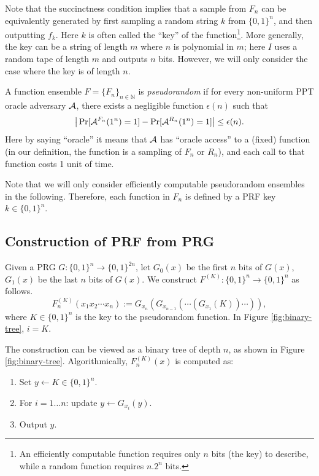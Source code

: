 Note that the succinctness condition implies that a sample from $F_n$ can be equivalently generated by first sampling a random string $k$ from $\{0, 1\}^n$, and then outputting $f_k$. Here $k$ is often called the ``key'' of the function\footnote{An efficiently computable function requires only $n$ bits (the key) to describe, while a random function requires $n.2^n$ bits.}. More generally, the key can be a string of length $m$ where $n$ is polynomial in $m$; here $I$ uses a random tape of length $m$ and outputs $n$ bits. However, we will only consider the case where the key is of length $n$.

\begin{definition}
    A function ensemble $F = \{F_n\}_{n \in \mathbb{N}}$ is \emph{pseudorandom} if
    for every non-uniform PPT oracle adversary $\mathcal{A}$, there exists a negligible function $\epsilon(n)$ such that
    \[
        \big| \Pr[\mathcal{A}^{F_n} (1^n) = 1] - \Pr[\mathcal{A}^{R_n} (1^n) = 1]  \big| \leq \epsilon(n).
    \]
    Here by saying ``oracle'' it means that $\mathcal{A}$ has ``oracle access'' to a (fixed) function (in our definition, the function is a sampling of $F_n$ or $R_n$), and each call to that function costs 1 unit of time.
\end{definition}

Note that we will only consider efficiently computable pseudorandom ensembles in the following. Therefore, each function in $F_n$ is defined by a PRF key $k \in \{0, 1\}^n$.


\subsection{Construction of PRF from PRG}

\begin{construction}
    Given a PRG $G: \{0, 1\}^n \rightarrow \{0, 1\}^{2n}$,
    let $G_0(x)$ be the first $n$ bits of $G(x)$, $G_1(x)$ be the last $n$ bits of $G(x)$.
    We construct $F^{(K)}: \{0, 1\}^n \rightarrow \{0, 1\}^n$ as follows.
    \[
        F^{(K)}_n(x_1 x_2 \cdots x_n) := G_{x_n}(G_{x_{n-1}} (\cdots(G_{x_1}(K)) \cdots  )),
    \]
    where $K \in \{0,1\}^n$ is the key to the pseudorandom function. In Figure \ref{fig:binary-tree}, $i = K$.
\end{construction}
The construction can be viewed as a binary tree of depth $n$, as shown in Figure \ref{fig:binary-tree}. Algorithmically, $F_n^{(K)}(x)$ is computed as:
\begin{enumerate}
    \item Set $y \gets K \in \{0, 1\}^n$.
    \item For $i = 1 \dots n$: update $y \gets G_{x_i}(y)$.
    \item Output $y$.
\end{enumerate}

